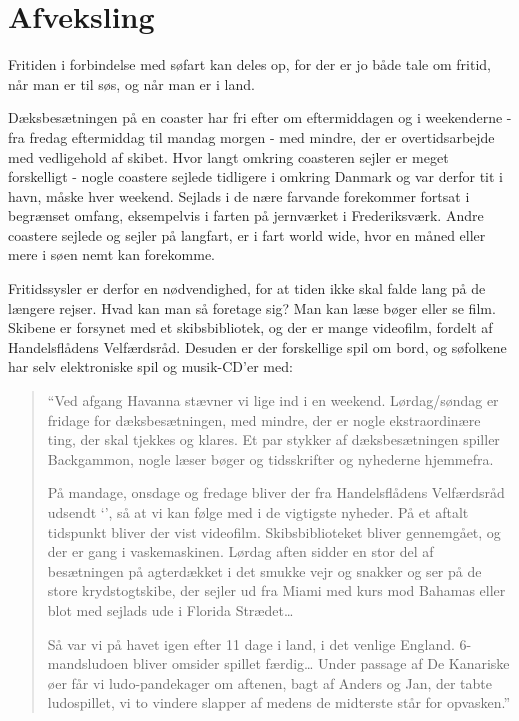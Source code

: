 \chapter{Afveksling}\label{afveksling}

Fritiden i forbindelse med søfart kan deles op, for der er jo både tale
om fritid, når man er til søs, og når man er i land. 

Dæksbesætningen på en coaster har fri efter  om eftermiddagen og i weekenderne -
fra fredag eftermiddag til mandag morgen - med mindre, der er
overtidsarbejde med vedligehold af skibet. Hvor langt omkring coasteren
sejler er meget forskelligt - nogle coastere sejlede tidligere i
 omkring Danmark og var derfor tit i
havn, måske hver weekend. Sejlads i de nære farvande forekommer fortsat i
begrænset omfang, eksempelvis i farten på jernværket i Frederiksværk.
Andre coastere sejlede og sejler på langfart, er i fart world wide, hvor
en måned eller mere i søen nemt kan forekomme.

Fritidssysler er derfor en nødvendighed, for at tiden ikke skal falde lang
på de længere rejser.  Hvad kan man så foretage sig? Man kan læse bøger
eller se film. Skibene er forsynet med et skibsbibliotek, og der er mange
videofilm, fordelt af Handelsflådens Velfærdsråd. Desuden er der
forskellige spil om bord, og søfolkene har selv elektroniske spil og
musik-CD'er med: 

\begin{quote}
    ``Ved afgang Havanna stævner vi lige ind i en weekend.  Lørdag/søndag
    er fridage for dæksbesætningen, med mindre, der er nogle
    ekstraordinære ting, der skal tjekkes og klares. Et par stykker af
    dæksbesætningen spiller Backgammon, nogle læser bøger og tidsskrifter
    og nyhederne hjemmefra.

    På mandage, onsdage og fredage bliver der fra Handelsflådens
    Velfærdsråd udsendt `', så at vi kan følge med i de vigtigste nyheder. På et
    aftalt tidspunkt bliver der vist videofilm.  Skibsbiblioteket bliver
    gennemgået, og der er gang i vaskemaskinen.  Lørdag aften sidder en
    stor del af besætningen på agterdækket i det smukke vejr og snakker og
    ser på de store krydstogtskibe, der sejler ud fra Miami med kurs mod
    Bahamas eller blot med sejlads ude i Florida Strædet\ldots{}
    
    Så var vi på havet igen efter 11 dage i land, i det venlige England.
    6-mandsludoen bliver omsider spillet færdig\ldots{} Under passage af
    De Kanariske øer får vi ludo-pandekager om aftenen, bagt af Anders og
    Jan, der tabte ludospillet, vi to vindere slapper af medens de
    midterste står for opvasken.'' 
\end{quote}


